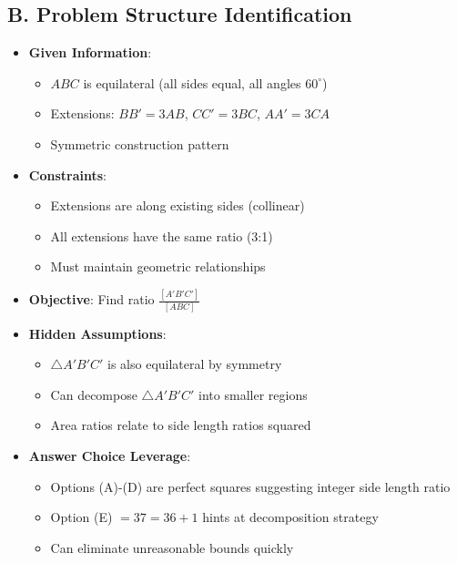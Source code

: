\documentclass[11pt]{article}
\begin{document}
\begin{problemconfigbox}
\subsection*{B. Problem Structure Identification}
\begin{itemize}[leftmargin=*]
    \item \textbf{Given Information}: 
    \begin{itemize}
        \item $ABC$ is equilateral (all sides equal, all angles $60^{\circ}$)
        \item Extensions: $BB' = 3AB$, $CC' = 3BC$, $AA' = 3CA$
        \item Symmetric construction pattern
    \end{itemize}
    \item \textbf{Constraints}: 
    \begin{itemize}
        \item Extensions are along existing sides (collinear)
        \item All extensions have the same ratio (3:1)
        \item Must maintain geometric relationships
    \end{itemize}
    \item \textbf{Objective}: Find ratio $\frac{[A'B'C']}{[ABC]}$
    \item \textbf{Hidden Assumptions}: 
    \begin{itemize}
        \item $\triangle A'B'C'$ is also equilateral by symmetry
        \item Can decompose $\triangle A'B'C'$ into smaller regions
        \item Area ratios relate to side length ratios squared
    \end{itemize}
    \item \textbf{Answer Choice Leverage}: 
    \begin{itemize}
        \item Options (A)-(D) are perfect squares suggesting integer side length ratio
        \item Option (E) $= 37 = 36 + 1$ hints at decomposition strategy
        \item Can eliminate unreasonable bounds quickly
    \end{itemize}
\end{itemize}


\end{problemconfigbox}
\end{document}
